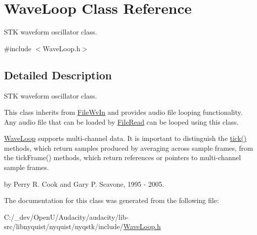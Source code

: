 \hypertarget{class_wave_loop}{}\section{Wave\+Loop Class Reference}
\label{class_wave_loop}


S\+TK waveform oscillator class.  




{\ttfamily \#include $<$Wave\+Loop.\+h$>$}



\subsection{Detailed Description}
S\+TK waveform oscillator class. 

This class inherits from \hyperlink{class_file_wv_in}{File\+Wv\+In} and provides audio file looping functionality. Any audio file that can be loaded by \hyperlink{class_file_read}{File\+Read} can be looped using this class.

\hyperlink{class_wave_loop}{Wave\+Loop} supports multi-\/channel data. It is important to distinguish the \hyperlink{instr_8cpp_a02d20b725355812062c8b0c91b172b61}{tick()} methods, which return samples produced by averaging across sample frames, from the tick\+Frame() methods, which return references or pointers to multi-\/channel sample frames.

by Perry R. Cook and Gary P. Scavone, 1995 -\/ 2005. 

The documentation for this class was generated from the following file\+:\begin{DoxyCompactItemize}
\item 
C\+:/\+\_\+dev/\+Open\+U/\+Audacity/audacity/lib-\/src/libnyquist/nyquist/nyqstk/include/\hyperlink{_wave_loop_8h}{Wave\+Loop.\+h}\end{DoxyCompactItemize}
